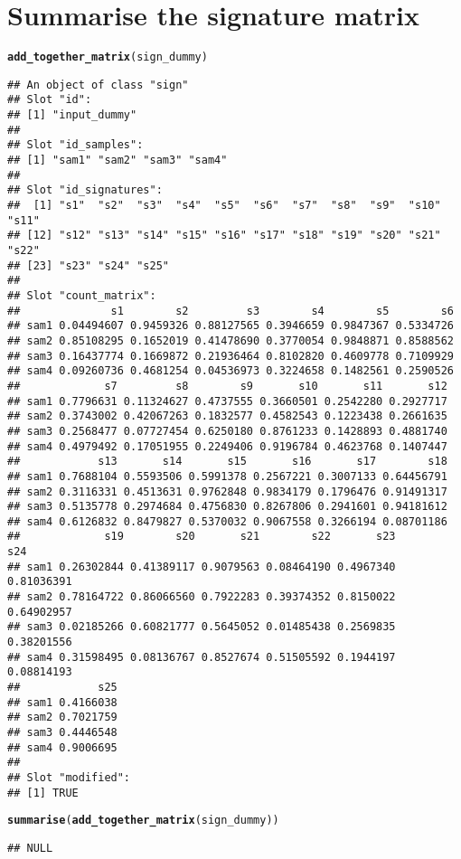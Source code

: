 \documentclass{article}\usepackage[]{graphicx}\usepackage[]{color}
\makeatletter
\newcommand{\hlstd}[1]{\textcolor[rgb]{0.345,0.345,0.345}{#1}}%
\newcommand{\hlkwd}[1]{\textcolor[rgb]{0.737,0.353,0.396}{\textbf{#1}}}%
\newenvironment{kframe}{%
 \def\at@end@of@kframe{}%
 \ifinner\ifhmode%
  \def\at@end@of@kframe{\end{minipage}}%
  \begin{minipage}{\columnwidth}%
 \fi\fi%
 \def\FrameCommand##1{\hskip\@totalleftmargin \hskip-\fboxsep
 \colorbox{shadecolor}{##1}\hskip-\fboxsep
     \hskip-\linewidth \hskip-\@totalleftmargin \hskip\columnwidth}%
 \MakeFramed {\advance\hsize-\width
   \@totalleftmargin\z@ \linewidth\hsize
   \@setminipage}}%
 {\par\unskip\endMakeFramed%
 \at@end@of@kframe}
\newenvironment{knitrout}{}{} %
\makeatother
\begin{document}
\section{Summarise the signature matrix}
\begin{knitrout}
\color{fgcolor}\begin{kframe}
\begin{alltt}
\hlkwd{add_together_matrix}\hlstd{(sign_dummy)}
\end{alltt}
\begin{verbatim}
## An object of class "sign"
## Slot "id":
## [1] "input_dummy"
## 
## Slot "id_samples":
## [1] "sam1" "sam2" "sam3" "sam4"
## 
## Slot "id_signatures":
##  [1] "s1"  "s2"  "s3"  "s4"  "s5"  "s6"  "s7"  "s8"  "s9"  "s10" "s11"
## [12] "s12" "s13" "s14" "s15" "s16" "s17" "s18" "s19" "s20" "s21" "s22"
## [23] "s23" "s24" "s25"
## 
## Slot "count_matrix":
##              s1        s2         s3        s4        s5        s6
## sam1 0.04494607 0.9459326 0.88127565 0.3946659 0.9847367 0.5334726
## sam2 0.85108295 0.1652019 0.41478690 0.3770054 0.9848871 0.8588562
## sam3 0.16437774 0.1669872 0.21936464 0.8102820 0.4609778 0.7109929
## sam4 0.09260736 0.4681254 0.04536973 0.3224658 0.1482561 0.2590526
##             s7         s8        s9       s10       s11       s12
## sam1 0.7796631 0.11324627 0.4737555 0.3660501 0.2542280 0.2927717
## sam2 0.3743002 0.42067263 0.1832577 0.4582543 0.1223438 0.2661635
## sam3 0.2568477 0.07727454 0.6250180 0.8761233 0.1428893 0.4881740
## sam4 0.4979492 0.17051955 0.2249406 0.9196784 0.4623768 0.1407447
##            s13       s14       s15       s16       s17        s18
## sam1 0.7688104 0.5593506 0.5991378 0.2567221 0.3007133 0.64456791
## sam2 0.3116331 0.4513631 0.9762848 0.9834179 0.1796476 0.91491317
## sam3 0.5135778 0.2974684 0.4756830 0.8267806 0.2941601 0.94181612
## sam4 0.6126832 0.8479827 0.5370032 0.9067558 0.3266194 0.08701186
##             s19        s20       s21        s22       s23        s24
## sam1 0.26302844 0.41389117 0.9079563 0.08464190 0.4967340 0.81036391
## sam2 0.78164722 0.86066560 0.7922283 0.39374352 0.8150022 0.64902957
## sam3 0.02185266 0.60821777 0.5645052 0.01485438 0.2569835 0.38201556
## sam4 0.31598495 0.08136767 0.8527674 0.51505592 0.1944197 0.08814193
##            s25
## sam1 0.4166038
## sam2 0.7021759
## sam3 0.4446548
## sam4 0.9006695
## 
## Slot "modified":
## [1] TRUE
\end{verbatim}
\begin{alltt}
\hlkwd{summarise}\hlstd{(}\hlkwd{add_together_matrix}\hlstd{(sign_dummy))}
\end{alltt}
\begin{verbatim}
## NULL
\end{verbatim}
\end{kframe}
\end{knitrout}
\end{document}
